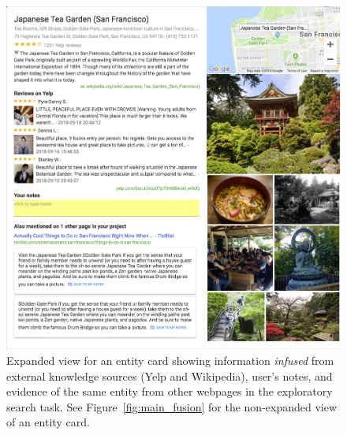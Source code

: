 \begin{figure}
    \centering
    \includegraphics[width=1.0\columnwidth]{Chapters/Fusion2/expanded.png}
    \caption[Expanded view for an entity card.]{Expanded view for an entity card showing information \emph{infused} from external knowledge sources (Yelp and Wikipedia), user's notes, and evidence of the same entity from other webpages in the exploratory search task. See Figure~\ref{fig:main_fusion} for the non-expanded view of an entity card.}
    \label{fig:expanded_fusion}
\end{figure}


